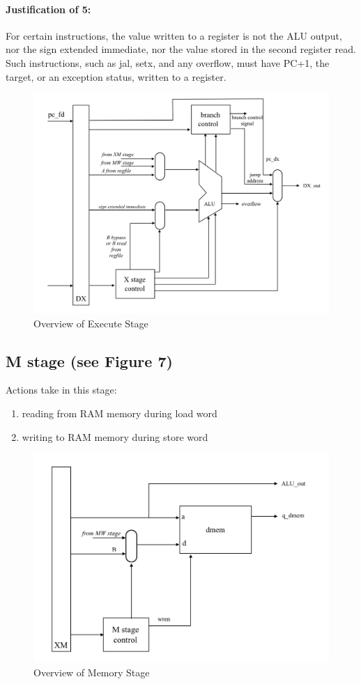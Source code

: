 \documentclass[letterpaper]{article}
\begin{document}
\paragraph{Justification of 5:} For certain instructions, the value written to a register is not the ALU output, nor the sign extended immediate, nor the value stored in the second register read. Such instructions, such as jal, setx, and any overflow, must have PC+1, the target, or an exception status, written to a register. 
\begin{figure}[h]
    \centering
    \includegraphics[width=\textwidth]{Execute.png}
    \caption{Overview of Execute Stage}
    \label{fig:my_label}
\end{figure}

\subsection{M stage (see Figure 7)}
Actions take in this stage:
\begin{enumerate}
    \item reading from RAM memory during load word
    \item writing to RAM memory during store word
\end{enumerate}
\begin{figure}[h]
    \centering
    \includegraphics[width=\textwidth]{Memory.png}
    \caption{Overview of Memory Stage}
    \label{fig:my_label}
\end{figure}
\end{document}
